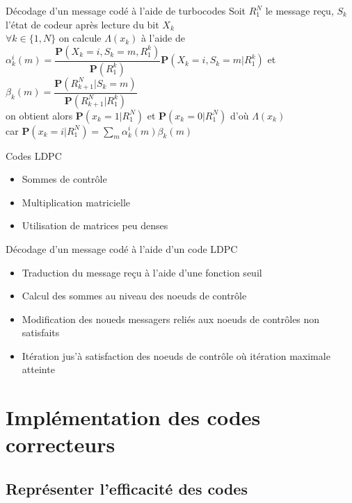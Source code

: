 \documentclass[11pt]{beamer}
\begin{document}
\begin{frame}{D\'ecodage d'un message cod\'e \`a l'aide de turbocodes}
Soit $R_1^N$ le message re\c{c}u, $S_k$ l'\'etat de codeur apr\`es lecture du bit $X_k$\\
$\forall k \in \{1, N\}$ on calcule $\Lambda(x_k)$ \`a l'aide de $\alpha_k^i(m)=\dfrac{\mathbf{P}(X_k=i,S_k=m,R_1^k)}{\mathbf{P}(R_1^k)}\mathbf{P}(X_k=i,S_k=m|R_1^k)$ et\\
$\beta_k(m)=\dfrac{\mathbf{P}(R_{k+1}^N|S_k=m)}{\mathbf{P}(R_{k+1}^N|R_1^k)}$\\
on obtient alors $\mathbf{P}(x_k=1|R_1^N)$ et $\mathbf{P}(x_k=0|R_1^N)$ d'o\`u $\Lambda(x_k)$\\
car $\mathbf{P}(x_k=i|R_1^N)=\sum\limits_m\alpha_k^i(m)\beta_k(m)$
\end{frame}

\begin{frame}{Codes LDPC}
	\begin{itemize}
		\item Sommes de contrôle
		\item Multiplication matricielle
		\item Utilisation de matrices peu denses
	\end{itemize}
\end{frame}

\begin{frame}{D\'ecodage d'un message cod\'e \`a l'aide d'un code LDPC}
	\begin{itemize}
		\item Traduction du message re\c{c}u \`a l'aide d'une fonction seuil
		\item Calcul des sommes au niveau des noeuds de contr\^ole
		\item Modification des noueds messagers reli\'es aux noeuds de contrôles non satisfaits
		\item It\'eration jus'\`a satisfaction des noeuds de contr\^ole o\`u it\'eration maximale atteinte
	\end{itemize}
\end{frame}


\section{Impl\'ementation des codes correcteurs}
\subsection{Repr\'esenter l'efficacit\'e des codes}
\end{document}
